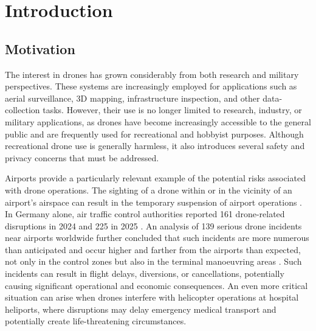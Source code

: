 
%

\chapter{Introduction}
\label{cha:introduction}

\glsresetall


\epigraphfontsize{\small\itshape}
\setlength\epigraphwidth{12.5cm}
\setlength\epigraphrule{0pt}

\section{Motivation} \label{sec.1:Motivation}

The interest in drones has grown considerably from both research and military perspectives. These systems are increasingly employed for applications such as aerial surveillance, \gls{3D} mapping, infrastructure inspection, and other data-collection tasks. However, their use is no longer limited to research, industry, or military applications, as drones have become increasingly accessible to the general public and are frequently used for recreational and hobbyist purposes. Although recreational drone use is generally harmless, it also introduces several safety and privacy concerns that must be addressed.

Airports provide a particularly relevant example of the potential risks associated with drone operations. The sighting of a drone within or in the vicinity of an airport's airspace can result in the temporary suspension of airport operations \cite{euronews2025drone,dw2025berlin,abcnews2025drone,inews2025denmark}. In Germany alone, air traffic control authorities reported 161 drone-related disruptions in 2024 and 225 in 2025 \cite{dfs2026airtraffic}. An analysis of 139 serious drone incidents near airports worldwide further concluded that such incidents are more numerous than anticipated and occur higher and farther from the airports than expected, not only in the control zones but also in the terminal manoeuvring areas \cite{pyrgies2019}. Such incidents can result in flight delays, diversions, or cancellations, potentially causing significant operational and economic consequences. An even more critical situation can arise when drones interfere with helicopter operations at hospital heliports, where disruptions may delay emergency medical transport and potentially create life-threatening circumstances.

